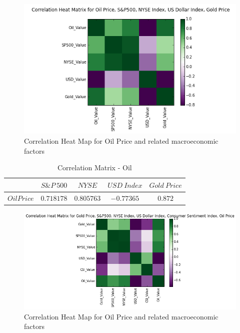 \documentclass[runningheads]{llncs}
\begin{document}
\begin{figure}
\centering
\includegraphics[width=\textwidth]{HeatMap_Oil_Monthly.png}
\caption{Correlation Heat Map for Oil Price and related macroeconomic factors}
\label{fig:HeatMap_Oil_Monthly.png}
\end{figure}

\begin{table}
\begin{center}
\begin{tabular}{|c|c|c|c|c|}
\hline
$ $ & $ S\&P\ 500 $ & $ NYSE $ & $ USD\ Index $ & $Gold\ Price$ \\ \hline
$Oil Price$ & $0.718178$ & $0.805763$ & $-0.77365$ & $0.872$ \\ \hline
\end{tabular}
\end{center}
\caption{Correlation Matrix - Oil}
\end{table}

\begin{figure}
\centering
\includegraphics[width=\textwidth]{HeatMap_Gold_Monthly.png}
\caption{Correlation Heat Map for Oil Price and related macroeconomic factors}
\label{fig:HeatMap_Gold_Daily.png}
\end{figure}
\end{document}
